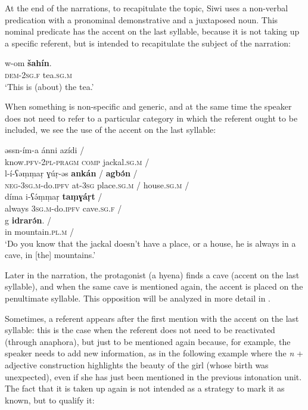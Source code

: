 \documentclass[output=paper]{langsci/langscibook}
\begin{document}
At the end of the narrations, to recapitulate the topic, Siwi uses a non-verbal predication with a pronominal demonstrative and a juxtaposed noun. This nominal predicate has the accent on the last syllable, because it is not taking up a specific referent, but is intended to recapitulate the subject of the narration:

\begin{exe}
\ex\label{5ex:10}
\gll	w-om			{\textbf{šahín}}. \\
	{\textsc{dem-2sg.f}}	tea.{\textsc{sg.m}} \\
\glt	`This is (about) the tea.'
\end{exe}

When something is non-specific and generic, and at the same time the speaker does not need to refer to a particular category in which the referent ought to be included, we see the use of the accent on the last syllable:

\begin{exe}
\ex\label{5ex:11}
\gll	əssn-ím-a	ánni	azídi	/ \\
	know.{\textsc{pfv-2pl-pragm}}	{\textsc{comp}}	jackal.{\textsc{sg.m}}	/ \\
\glt
\exi{}
\gll	l-í-ʕəṃṃaṛ	ɣúṛ-əs	{\textbf{ankán}}	/	{\textbf{agbə́n}}	/ \\
	{\textsc{neg-3sg.m}}-do.{\textsc{ipfv}}	at-{\textsc{3sg}}	place.{\textsc{sg.m}}	/	house.{\textsc{sg.m}}	/ \\
\glt
\exi{}
\gll	díma	i-ʕə́ṃṃaṛ	{\textbf{taṃɣáṛt}}	/ \\
	always	{\textsc{3sg.m}}-do.{\textsc{ipfv}}	cave.{\textsc{sg.f}}	/ \\
\glt
\exi{}
\gll	g	{\textbf{idrarə́n}}.	/ \\
	in	mountain.{\textsc{pl.m}}	/ \\
\glt	`Do you know that the jackal doesn't have a place, or a house, he is always in a cave, in [the] mountains.'
\end{exe}

{
Later in the narration, the protagonist (a hyena) finds a cave (accent on the last syllable), and when the same cave is mentioned again, the accent is placed on the penultimate syllable. This opposition will be analyzed in more detail in .
}

Sometimes, a referent appears after the first mention with the accent on the last syllable: this is the case when the referent does not need to be reactivated (through anaphora), but just to be mentioned again because, for example, the speaker needs to add new information, as in the following example where the {\emph{n}} + adjective construction highlights the beauty of the girl (whose birth was unexpected), even if she has just been mentioned in the previous intonation unit. The fact that it is taken up again is not intended as a strategy to mark it as known, but to qualify it:
\end{document}
